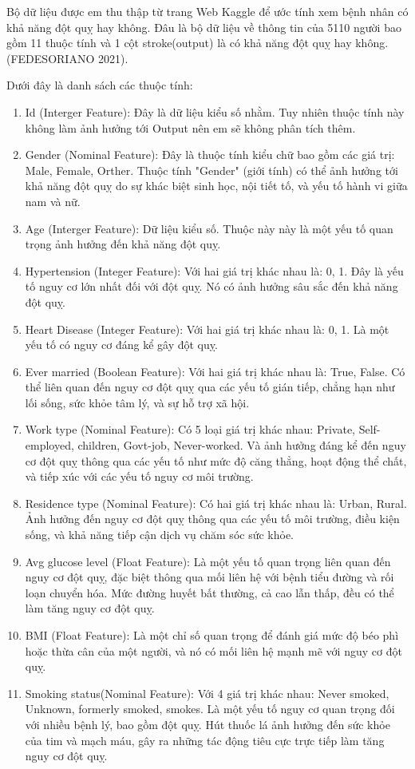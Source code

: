 \documentclass[11pt]{article}
\begin{document}
	
	Bộ dữ liệu được em thu thập từ trang Web Kaggle để ước tính xem bệnh nhân có khả năng đột quỵ hay không. Đâu là bộ dữ liệu về thông tin của 5110 người bao gồm 11 thuộc tính và 1 cột stroke(output) là có khả năng đột quỵ hay không. (FEDESORIANO 2021). 
	
	Dưới đây là danh sách các thuộc tính:
	\begin{enumerate}
		\item Id (Interger Feature): Đây là dữ liệu kiểu số nhằm. Tuy nhiên thuộc tính này không làm ảnh hưởng tới Output nên em sẽ không phân tích thêm.
		\item Gender (Nominal Feature): Đây là thuộc tính kiểu chữ bao gồm các giá trị: Male, Female, Orther. Thuộc tính "Gender" (giới tính) có thể ảnh hưởng tới khả năng đột quỵ do sự khác biệt sinh học, nội tiết tố, và yếu tố hành vi giữa nam và nữ.
		\item Age (Interger Feature): Dữ liệu kiểu số. Thuộc này này là một yếu tố quan trọng ảnh hưởng đến khả năng đột quỵ.
		\item Hypertension (Integer Feature): Với hai giá trị khác nhau là: 0, 1.
		Đây là yếu tố nguy cơ lớn nhất đối với đột quỵ. Nó có ảnh hưởng sâu sắc đến khả năng đột quỵ.
		\item Heart Disease (Integer Feature): Với hai giá trị khác nhau là: 0, 1. Là một yếu tố có nguy cơ đáng kể gây đột quỵ. 
		\item Ever married (Boolean Feature): Với hai giá trị khác nhau là: True, False. Có thể liên quan đến nguy cơ đột quỵ qua các yếu tố gián tiếp, chẳng hạn như lối sống, sức khỏe tâm lý, và sự hỗ trợ xã hội.
		\item Work type (Nominal Feature): Có 5 loại giá trị khác nhau: Private, Self-employed, children, Govt-job, Never-worked. Và ảnh hưởng đáng kể đến nguy cơ đột quỵ thông qua các yếu tố như mức độ căng thẳng, hoạt động thể chất, và tiếp xúc với các yếu tố nguy cơ môi trường.
		\item Residence type (Nominal Feature): Có hai giá trị khác nhau là: Urban, Rural. Ảnh hưởng đến nguy cơ đột quỵ thông qua các yếu tố môi trường, điều kiện sống, và khả năng tiếp cận dịch vụ chăm sóc sức khỏe.
		\item Avg glucose level (Float Feature): Là một yếu tố quan trọng liên quan đến nguy cơ đột quỵ, đặc biệt thông qua mối liên hệ với bệnh tiểu đường và rối loạn chuyển hóa. Mức đường huyết bất thường, cả cao lẫn thấp, đều có thể làm tăng nguy cơ đột quỵ.
		\item BMI (Float Feature): Là một chỉ số quan trọng để đánh giá mức độ béo phì hoặc thừa cân của một người, và nó có mối liên hệ mạnh mẽ với nguy cơ đột quỵ.
		\item Smoking status(Nominal Feature): Với 4 giá trị khác nhau: Never smoked, Unknown, formerly smoked, smokes. Là một yếu tố nguy cơ quan trọng đối với nhiều bệnh lý, bao gồm đột quỵ. Hút thuốc lá ảnh hưởng đến sức khỏe của tim và mạch máu, gây ra những tác động tiêu cực trực tiếp làm tăng nguy cơ đột quỵ. 
	\end{enumerate}
	
\end{document}
